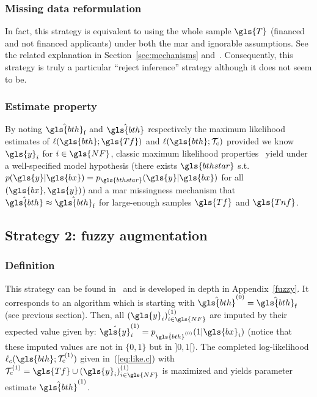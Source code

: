 \subsubsection{Missing data reformulation}
In fact, this strategy is equivalent to using the whole sample $\gls{T}$ (financed and not financed applicants) under both the \gls{mar} and ignorable assumptions. See the related explanation in Section~\ref{sec:mechanisms} and~\cite{zadrozny2004learning}. Consequently, this strategy is truly a particular ``reject inference'' strategy although it does not seem to be.

\subsubsection{Estimate property}
By noting $\hat{\gls{bth}}_\text{f}$ and $\hat{\gls{bth}}$ respectively the maximum likelihood estimates of $\ell(\gls{bth};\gls{Tf})$ and $\ell(\gls{bth};\mathcal{T}_{\text{c}})$ provided we know $\gls{y}_i$ for $i \in \gls{NF}$, classic maximum likelihood properties~\cite{10.2307/1912526,zadrozny2004learning} yield under a well-specified model hypothesis (there exists $\gls{bthstar}$ s.t.\ $p(\gls{y} | \gls{bx}) = p_{\gls{bthstar}}(\gls{y} | \gls{bx})$ for all $(\gls{bx},\gls{y})$) and a \gls{mar} missingness mechanism that $\hat{\gls{bth}} \approx \hat{\gls{bth}}_\text{f}$ for large-enough samples $\gls{Tf}$ and $\gls{Tnf}$.



\subsection{Strategy 2: fuzzy augmentation}

\subsubsection{Definition}
This strategy can be found in~\cite{economix} and is developed in depth in Appendix~\ref{fuzzy}. It corresponds to an algorithm which is starting with $\hat{\gls{bth}}^{(0)} = \hat{\gls{bth}}_\text{f}$ (see previous section). Then, all $(\gls{y}_i)^{(1)}_{i \in \gls{NF}}$ are imputed by their expected value given by: $\hat{\gls{y}}^{(1)}_i = p_{\hat{\gls{bth}}^{(0)}}(1 | \gls{bx}_i)$ (notice that these imputed values are not in $\{0,1\}$ but in $]0,1[$). The completed log-likelihood $\ell_c(\gls{bth};\mathcal{T}_{\text{c}}^{(1)})$ given in~(\ref{eq:like.c}) with $\mathcal{T}_{\text{c}}^{(1)}=\gls{Tf} \cup (\gls{y}_i)^{(1)}_{i \in \gls{NF}}$ is maximized and yields parameter estimate $\hat{\gls{bth}}^{(1)}$.

